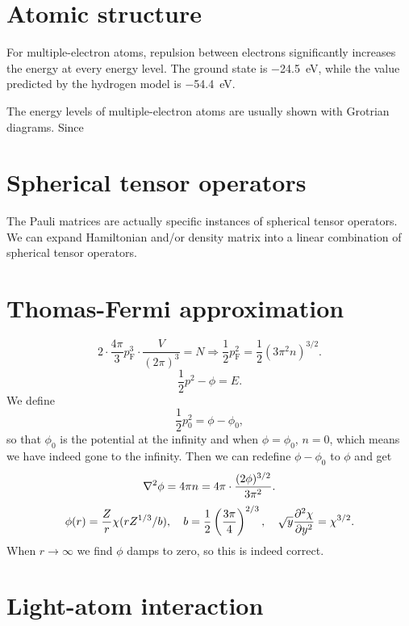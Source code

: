 \documentclass[hyperref, a4paper]{article}
\begin{document}
\section{Atomic structure}

For multiple-electron atoms, 
repulsion between electrons significantly increases 
the energy at every energy level.
The ground state is \SI{-24.5}{eV},
while the value predicted by the 
hydrogen model is \SI{-54.4}{eV}.

The energy levels of multiple-electron atoms 
are usually shown with Grotrian diagrams.
Since 

\section{Spherical tensor operators}

The Pauli matrices are actually specific instances of 
spherical tensor operators.
We can expand Hamiltonian and/or density matrix 
into a linear combination of spherical tensor operators.

\section{Thomas-Fermi approximation}

\begin{equation}
    2 \cdot \frac{4 \pi}{3} p_{\text{F}}^3 \cdot \frac{V}{(2\pi)^3} = N \Rightarrow 
    \frac{1}{2} p_{\text{F}}^2 = \frac{1}{2} (3 \pi^2 n)^{3/2}.
\end{equation}
\begin{equation}
    \frac{1}{2} p^2 - \phi = E.
\end{equation}
We define 
\begin{equation}
    \frac{1}{2} p_0^2 = \phi - \phi_0,
\end{equation}
so that $\phi_0$ is the potential at the infinity 
and when $\phi = \phi_0$, $n = 0$,
which means we have indeed gone to the infinity.
Then we can redefine $\phi - \phi_0$ to $\phi$ and get
\begin{equation}
    \laplacian \phi = 4\pi n = 4\pi \cdot \frac{(2\phi)^{3/2}}{3 \pi^2}.
\end{equation}
\begin{equation}
    \phi(r) = \frac{Z}{r} \chi(r Z^{1/3} / b), \quad 
    b = \frac{1}{2} \left(\frac{3 \pi}{4}\right)^{2/3}, \quad 
    \sqrt{y} \pdv[2]{\chi}{y} = \chi^{3/2}.
\end{equation}
When $r \to \infty$ we find $\phi$ damps to zero, 
so this is indeed correct.

\section{Light-atom interaction}
\end{document}
